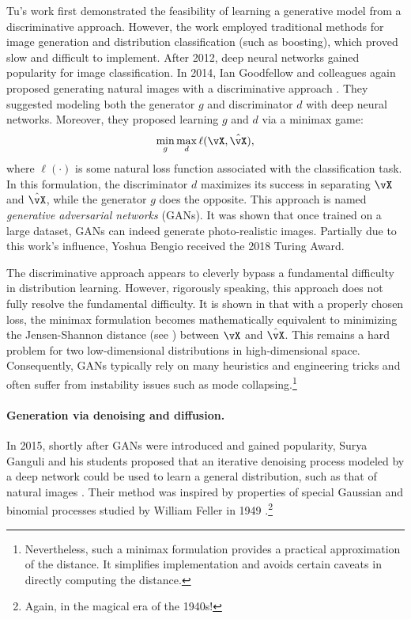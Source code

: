 \documentclass[../../book-main.tex]{subfiles}
\begin{document}
Tu's work \cite{Tu-2007} first demonstrated the feasibility of learning a generative model from a discriminative approach. However, the work employed traditional methods for image generation and distribution classification (such as boosting), which proved slow and difficult to implement. After 2012, deep neural networks gained popularity for image classification. In 2014, Ian Goodfellow and colleagues again proposed generating natural images with a discriminative approach \cite{Goodfellow-2014}. They suggested modeling both the generator \(g\) and discriminator \(d\) with deep neural networks. Moreover, they proposed learning \(g\) and \(d\) via a minimax game:
\begin{equation}
    \min_{g} \max_{d} \ell(\vX, \hat{\vX}),
\end{equation}
where \(\ell(\cdot)\) is some natural loss function associated with the classification task. In this formulation, the discriminator \(d\) maximizes its success in separating \(\vX\) and \(\hat{\vX}\), while the generator \(g\) does the opposite. This approach is named \textit{generative adversarial networks} (GANs). It was shown that once trained on a large dataset, GANs can indeed generate photo-realistic images. Partially due to this work's influence, Yoshua Bengio received the 2018 Turing Award.

The discriminative approach appears to cleverly bypass a fundamental difficulty in distribution learning. However, rigorously speaking, this approach does not fully resolve the fundamental difficulty. It is shown in \cite{Goodfellow-2014} that with a properly chosen loss, the minimax formulation becomes mathematically equivalent to minimizing the Jensen-Shannon distance (see \cite{Cover-Thomas}) between \(\vX\) and \(\hat{\vX}\). This remains a hard problem for two low-dimensional distributions in high-dimensional space. Consequently, GANs typically rely on many heuristics and engineering tricks and often suffer from instability issues such as mode collapsing.\footnote{Nevertheless, such a minimax formulation provides a practical approximation of the distance. It simplifies implementation and avoids certain caveats in directly computing the distance.}

\paragraph{Generation via denoising and diffusion.}
In 2015, shortly after GANs were introduced and gained popularity, Surya Ganguli and his students proposed that an iterative denoising process modeled by a deep network could be used to learn a general distribution, such as that of natural images \cite{Sohl-Dickstein2015}. Their method was inspired by properties of special Gaussian and binomial processes studied by William Feller in 1949 \cite{Feller1949OnTT}.\footnote{Again, in the magical era of the 1940s!}
\end{document}
